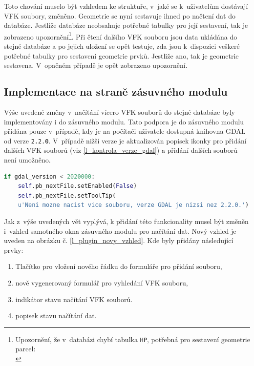 \documentclass[a4paper,12pt,oneside]{book}
\begin{document}
Toto chování muselo být vzhledem ke struktuře, v~jaké se k~uživatelům dostávají VFK soubory, změněno. Geometrie se nyní sestavuje ihned po načtení dat do databáze. Jestliže databáze neobsahuje potřebné tabulky pro její sestavení, tak je zobrazeno upozornění\footnote{Upozornění, že v~databázi chybí tabulka \texttt{HP}, potřebná pro sestavení geometrie parcel:\\}. Při čtení dalšího VFK souboru jsou data ukládána do stejné databáze a po jejich uložení se opět testuje, zda jsou k~dispozici veškeré potřebné tabulky pro sestavení geometrie prvků. Jestliže ano, tak je geometrie sestavena. V~opačném případě je opět zobrazeno upozornění. 

\subsection{Implementace na straně zásuvného modulu}
Výše uvedené změny v~načítání vícero VFK souborů do stejné databáze byly implementovány i do zásuvného modulu. Tato podpora je do zásuvného modulu přidána pouze v~případě, kdy je na počítači uživatele dostupná knihovna GDAL od verze \texttt{2.2.0}. V~případě nižší verze je aktualizován popisek ikonky pro přidání dalších VFK souborů (viz \ref{l_kontrola_verze_gdal}) a přidání dalších souborů není umožněno.

\begin{lstlisting}[language=Python, 
		    caption={Kontrola verze GDAL na straně VFK pluginu}, 
		    keywordstyle=\color{blue}\ttfamily,
		    stringstyle=\color{red}\ttfamily,
		    commentstyle=\color{green}\ttfamily, morekeywords={self},
		    label=l_kontrola_verze_gdal]
if gdal_version < 2020000:
    self.pb_nextFile.setEnabled(False)
    self.pb_nextFile.setToolTip(
	u'Neni mozne nacist vice souboru, verze GDAL je nizsi nez 2.2.0.')
\end{lstlisting}

Jak z~výše uvedených vět vyplývá, k přidání této funkcionality musel být změněn i~vzhled samotného okna zásuvného modulu pro načítání dat. Nový vzhled je uveden na obrázku č. \ref{l_plugin_novy_vzhled}. Kde byly přidány následující prvky:

\begin{enumerate}
 \item Tlačítko pro vložení nového řádku do formuláře pro přidání souboru,
 \item nově vygenerovaný formulář pro vyhledání VFK souboru,
 \item indikátor stavu načítání VFK souborů.
 \item popisek stavu načítání dat.
\end{enumerate}
\end{document}
